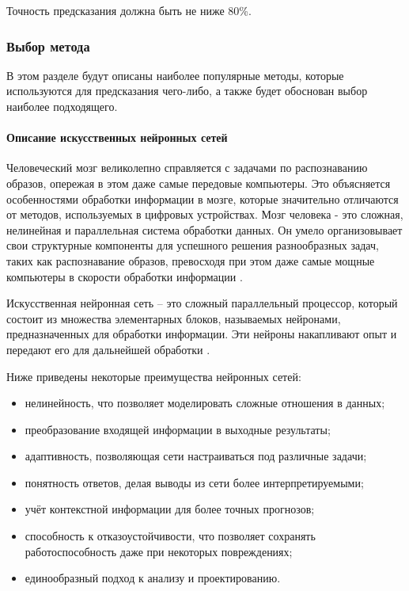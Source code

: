Точность предсказания должна быть не ниже 80\%.

\subsubsection{Выбор метода}

В этом разделе будут описаны наиболее популярные методы, которые используются для предсказания чего-либо, а также будет обоснован выбор наиболее подходящего.

\paragraph{Описание искусственных нейронных сетей}

Человеческий мозг великолепно справляется с задачами по распознаванию образов, опережая в этом даже самые передовые компьютеры. Это объясняется особенностями обработки информации в мозге, которые значительно отличаются от методов, используемых в цифровых устройствах. Мозг человека - это сложная, нелинейная и параллельная система обработки данных. Он умело организовывает свои структурные компоненты для успешного решения разнообразных задач, таких как распознавание образов, превосходя при этом даже самые мощные компьютеры в скорости обработки информации .

Искусственная нейронная сеть – это сложный параллельный процессор, который состоит из множества элементарных блоков, называемых нейронами, предназначенных для обработки информации. Эти нейроны накапливают опыт и передают его для дальнейшей обработки .

Ниже приведены некоторые преимущества нейронных сетей:
\begin{itemize}
    \item нелинейность, что позволяет моделировать сложные отношения в данных;
    \item преобразование входящей информации в выходные результаты;
    \item адаптивность, позволяющая сети настраиваться под различные задачи;
    \item понятность ответов, делая выводы из сети более интерпретируемыми;
    \item учёт контекстной информации для более точных прогнозов;
    \item способность к отказоустойчивости, что позволяет сохранять работоспособность даже при некоторых повреждениях;
    \item единообразный подход к анализу и проектированию.
\end{itemize}


